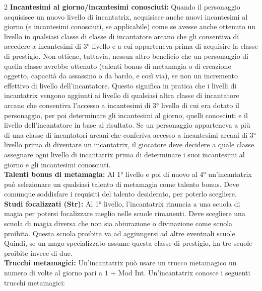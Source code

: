 \documentclass[10pt, a4paper]{report}
\begin{document}
\begin{multicols}{2}
\textbf{Incantesimi al giorno/incantesimi conosciuti:} Quando il personaggio acquisisce un nuovo livello di incantatrix, acquisisce anche nuovi incantesimi al giorno (e incantesimi conosciuti, se applicabile) come se avesse anche ottenuto un livello in qualsiasi classe di classe di incantatore arcano che gli consentiva di accedere a incantesimi di 3° livello e a cui apparteneva prima di acquisire la classe di prestigio. Non ottiene, tuttavia, nessun altro beneficio che un personaggio di quella classe avrebbe ottenuto (talenti bonus di metamagia o di creazione oggetto, capacità da assassino o da bardo, e così via), se non un incremento effettivo di livello dell'incantatore. Questo significa in pratica che i livelli di incantatrix vengono aggiunti ai livello di qualsiasi altra classe di incantatore arcano che consentiva l'accesso a incantesimi di 3° livello di cui era dotato il personaggio, per poi determinare gli incantesimi al giorno, quelli conosciuti e il livello dell'incantatore in base al risultato.
Se un personaggio apparteneva a più di una classe di incantatori arcani che conferiva accesso a incantesimi arcani di 3° livello prima di diventare un incantatrix, il giocatore deve decidere a quale classe assegnare ogni livello di incantatrix prima di determinare i suoi incantesimi al giorno e gli incantesimi conosciuti.\\

\textbf{Talenti bonus di metamagia:} Al 1° livello e poi di nuovo al 4° un'incantatrix può selezionare un qualsiasi talento di metamagia come talento bonus. Deve comunque soddisfare i requisiti del talento desiderato, per poterlo scegliere.\\

\textbf{Studi focalizzati (Str):} Al 1° livello, l'incantatrix rinuncia a una scuola di magia per potersi focalizzare meglio nelle scuole rimanenti. Deve scegliere una scuola di magia diversa che non sia abiurazione o divinazione come scuola proibita. Questa scuola proibita va ad aggiungersi ad altre eventuali scuole. Quindi, se un mago specializzato assume questa classe di prestigio, ha tre scuole proibite invece di due.\\

\textbf{Trucchi metamagici:} Un'incantatrix può usare un trucco metamagico un numero di volte al giorno pari a $1$ + Mod Int. Un'incantatrix conosce i seguenti trucchi metamagici:


\end{multicols}
\end{document}

